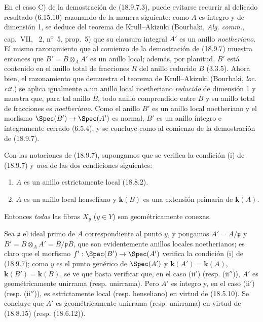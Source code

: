 \begin{remark}[18.9.7.8]
\label{IV.18.9.7.8}
En el caso C) de la demostración de (18.9.7.3), puede evitarse recurrir al delicado resultado (6.15.10) razonando de la manera siguiente: como $A$ es íntegro y de dimensión 1, se deduce del teorema de Krull--Akizuki (Bourbaki, \emph{Alg. comm.}, cap.~VII, \textsection~2, n\textsuperscript{o}~5, prop.~5) que su clausura integral $A'$ es un anillo \emph{noetheriano}. El mismo razonamiento que al comienzo de la demostración de (18.9.7) muestra entonces que $B'=B\otimes_A A'$ es un anillo local; además, por planitud, $B'$ está contenido en el anillo total de fracciones $R$ del anillo reducido $B$ (3.3.5). Ahora bien, el razonamiento que demuestra el teorema de Krull--Akizuki (Bourbaki, \emph{loc. cit.}) se aplica igualmente a un anillo local noetheriano \emph{reducido} de dimensión 1 y muestra que, para tal anillo $B$, todo anillo comprendido entre $B$ y su anillo total de fracciones es \emph{noetheriano}. Como el anillo $B'$ es un anillo local noetheriano y el morfismo $\Spec(B')\to\Spec(A')$ es normal, $B'$ es un anillo íntegro e íntegramente cerrado (6.5.4), y se concluye como al comienzo de la demostración de (18.9.7).
\end{remark}

\begin{corollary}[18.9.8]
\label{IV.18.9.8}
Con las notaciones de \textup{(18.9.7)}, supongamos que se verifica la condición \textup{(i)} de \textup{(18.9.7)} y \emph{una} de las dos condiciones siguientes:
\begin{enumerate}
  \item[\textup{(ii$'$)}] $A$ es un anillo estrictamente local \textup{(18.8.2)}.
  \item[\textup{(ii$''$)}] $A$ es un anillo local henseliano y $\boldsymbol k(B)$ es una extensión primaria de $\boldsymbol k(A)$.
\end{enumerate}
Entonces \emph{todas} las fibras $X_y$ \textup{($y\in Y$)} son geométricamente conexas.
\end{corollary}

Sea $\mathfrak p$ el ideal primo de $A$ correspondiente al punto $y$, y pongamos $A'=A/\mathfrak p$ y $B'=B\otimes_A A'=B/\mathfrak pB$, que son evidentemente anillos locales noetherianos; es claro que el morfismo $f':\Spec(B')\to\Spec(A')$ verifica la condición (i) de (18.9.7); como $y$ es el punto genérico de $\Spec(A')$ y $\boldsymbol k(A')=\boldsymbol k(A)$, $\boldsymbol k(B')=\boldsymbol k(B)$, se ve que basta verificar que, en el caso (ii$'$) (resp. (ii$''$)), $A'$ es geométricamente unirrama (resp. unirrama). Pero $A'$ es íntegro y, en el caso (ii$'$) (resp. (ii$''$)), es estrictamente local (resp. henseliano) en virtud de (18.5.10). Se concluye que $A'$ es geométricamente unirrama (resp. unirrama) en virtud de (18.8.15) (resp. (18.6.12)).

